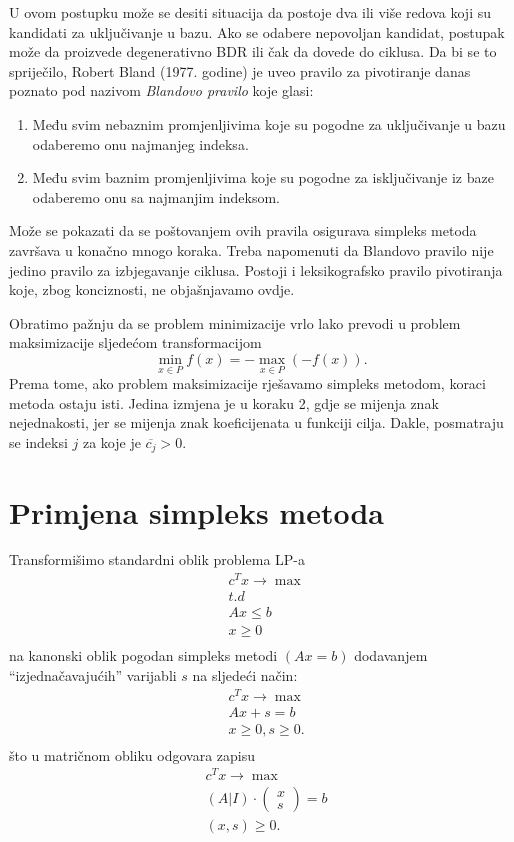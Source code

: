 \documentclass[a4paper, utf8, 11pt, colorlinks]{book}
\theoremstyle{definition}
\begin{document}
U ovom postupku  može se desiti situacija da postoje dva ili više redova koji su kandidati za uključivanje u bazu. Ako se odabere nepovoljan kandidat, postupak može da proizvede degenerativno BDR ili čak da dovede do ciklusa. 
Da bi se to spriječilo, Robert Bland (1977. godine) je uveo pravilo za pivotiranje danas poznato pod
nazivom \emph{Blandovo pravilo} koje glasi:
\begin{enumerate}
	\item   Među svim nebaznim promjenljivima koje su pogodne za uključivanje u bazu odaberemo onu najmanjeg indeksa. 
    \item Među svim baznim promjenljivima koje su pogodne za isključivanje iz baze odaberemo onu sa najmanjim indeksom.
\end{enumerate}
Može se pokazati da se poštovanjem ovih pravila osigurava simpleks metoda  završava u konačno mnogo koraka. Treba napomenuti da Blandovo pravilo nije jedino pravilo za izbjegavanje ciklusa. Postoji i leksikografsko pravilo pivotiranja koje, zbog konciznosti, ne objašnjavamo ovdje.  

Obratimo pažnju da se problem minimizacije vrlo lako prevodi u problem maksimizacije sljedećom transformacijom
$$ \min_{ x \in P} f(x) = - \max_{x \in P}(-f(x)).$$ 
Prema tome, ako  problem maksimizacije rješavamo simpleks metodom, koraci metoda ostaju isti. Jedina izmjena je u koraku 2, gdje se mijenja znak nejednakosti, jer se mijenja znak koeficijenata u funkciji cilja.  Dakle, posmatraju se indeksi $j$ za koje je $\overline{c_j} > 0$.

\section{Primjena simpleks metoda}
Transformišimo standardni oblik problema LP-a
  \begin{align*}
    & c^T x \rightarrow \max \\
    & {t.d} \nonumber \\
    & Ax \leq b \\
    & x \geq 0\\
\end{align*}
na kanonski oblik pogodan simpleks metodi $(A {x} = b)$ dodavanjem ``izjednačavajućih'' varijabli $s$ na sljedeći način:
\begin{align}
    & c^T x \rightarrow \max \\
    & Ax + s =  b \\
    & x \geq 0, s \geq 0. \\
\end{align}
što u matričnom obliku odgovara zapisu
\begin{align}
    & c^T x \rightarrow \max \\
    & (A | I) \cdot \left (\begin{array}{c}
         x  \\
         s 
    \end{array} \right ) =  b \\
    & (x, s) \geq 0. \\
\end{align} 
\end{document}
